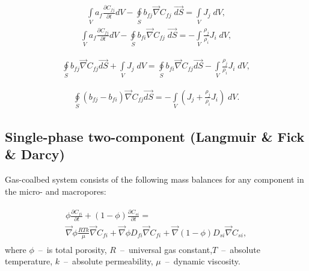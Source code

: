 \documentclass[a4paper,14pt,english]{extreport}
\begin{document}
\begin{eqnarray}
\label{eq:multiphase_diffusivity_simplified_integral_3}
\int \limits_{V} a_{f} \frac{\partial C_{fj}}{\partial t} dV - \oint \limits_{S} b_{fj} \vec{\nabla}C_{fj} \; \vec{dS} = \int \limits_{V} J_{j} \; dV,
\end{eqnarray}
\begin{eqnarray}
\label{eq:multiphase_diffusivity_simplified_integral_4}
\int \limits_{V} a_{f} \frac{\partial C_{fj}}{\partial t} dV - \oint \limits_{S} b_{fi} \vec{\nabla}C_{fj} \; \vec{dS} = -\int \limits_{V} \frac{\rho_j}{\rho_i}J_{i} \; dV,
\end{eqnarray}

\begin{eqnarray}
\label{eq:multiphase_diffusivity_simplified_integral_5}
\oint \limits_{S} b_{fj} \vec{\nabla}C_{fj} \vec{dS}
+ \int \limits_{V} J_{j} \; dV
= \oint \limits_{S} b_{fi} \vec{\nabla}C_{fj} \vec{dS}
-\int \limits_{V} \frac{\rho_j}{\rho_i}J_{i} \; dV,
\end{eqnarray}

\begin{eqnarray}
\label{eq:multiphase_diffusivity_simplified_integral_6}
\oint \limits_{S} \left(b_{fj}-b_{fi}\right) \vec{\nabla}C_{fj} \vec{dS}
= -\int \limits_{V} \left(J_{j}+\frac{\rho_j}{\rho_i}J_{i}\right) \; dV.
\end{eqnarray}

\subsection*{Single-phase two-component (Langmuir \& Fick \& Darcy)}
Gas-coalbed system consists of the following mass balances for any component in the micro- and macropores:

\begin{eqnarray}
\begin{gathered}
\label{eq:langm_fick_diffusivity_differential}
\phi\frac{\partial C_{fi}}{\partial t} + \left(\mathit{1}-\phi\right)\frac{\partial C_{si}}{\partial t} = \\ \vec{\nabla} \phi\frac{RTk}{\mu} \vec{\nabla}C_{fi} + \vec{\nabla} \phi D_{fi} \vec{\nabla}C_{fi} + \vec{\nabla}\left(\mathit{1}-\phi \right) D_{si} \vec{\nabla}C_{si},
\end{gathered}
\end{eqnarray}
where $\phi$~--~is total porosity, $R$~--~universal gas constant,$T$~--~absolute temperature, $k$~--~absolute permeability, $\mu$~--~dynamic viscosity.
\end{document}
